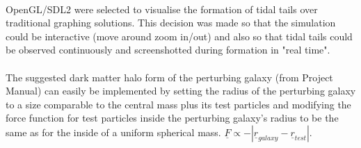 \documentclass[10pt,a4paper]{article}
\begin{document}
\\
OpenGL/SDL2 were selected to visualise the formation of tidal tails over traditional graphing solutions. This decision was made so that the simulation could be interactive (move around zoom in/out) and also so that tidal tails could be observed continuously and screenshotted during formation in "real time".
\\
\\
The suggested dark matter halo form of the perturbing galaxy (from Project Manual) can easily be implemented by setting the radius of the perturbing galaxy to a size comparable to the central mass plus its test particles and modifying the force function for test particles inside the perturbing galaxy's radius to be the same as for the inside of a uniform spherical mass. $\underline{F} \propto -|\underline{r}_{galaxy}-\underline{r}_{test}|$.
\clearpage
\end{document}
